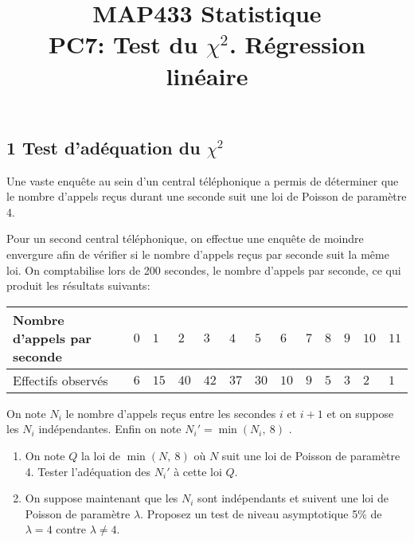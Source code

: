 \documentclass[a4paper,10pt]{article}
\begin{document}
\title{{\bf MAP433 Statistique}\\
{\bf PC7:  Test du $\chi^{2}$. R\'{e}gression lin\'{e}aire}}
\date{}
\maketitle

\subsection*{1 Test d'ad\'{e}quation du $\chi^{2}$}

Une vaste enqu\^{e}te au sein d'un central t\'{e}l\'{e}phonique a permis de d\'{e}terminer que le nombre d'appels re\c{c}us durant une seconde suit une loi de Poisson de param\`{e}tre 4.

Pour un second central t\'{e}l\'{e}phonique, on effectue une enqu\^{e}te de moindre envergure afin de v\'{e}rifier si le nombre d'appels re\c{c}us par seconde suit la m\^{e}me loi. On comptabilise lors de 200 secondes, le nombre d'appels par seconde, ce qui produit les r\'{e}sultats suivants:
\begin{center}
\begin{tabular}{|l|l|l|l|l|l|l|l|l|l|l|l|l|}
\hline
\multicolumn{1}{|l|}{Nombre d'appels par seconde}&	\multicolumn{1}{|l|}{$0$}&	\multicolumn{1}{|l|}{ $1$}&	\multicolumn{1}{|l|}{ $2$}&	\multicolumn{1}{|l|}{ $3$}&	\multicolumn{1}{|l|}{ $4$}&	\multicolumn{1}{|l|}{ $5$}&	\multicolumn{1}{|l|}{ $6$}&	\multicolumn{1}{|l|}{ $7$}&	\multicolumn{1}{|l|}{ $8$}&	\multicolumn{1}{|l|}{ $9$}&	\multicolumn{1}{|l|}{ $10$}&	\multicolumn{1}{|l|}{ $11$}	\\
\hline
\multicolumn{1}{|l|}{Effectifs observ\'{e}s}&	\multicolumn{1}{|l|}{$6$}&	\multicolumn{1}{|l|}{ $15$}&	\multicolumn{1}{|l|}{ $40$}&	\multicolumn{1}{|l|}{ $42$}&	\multicolumn{1}{|l|}{ $37$}&	\multicolumn{1}{|l|}{ $30$}&	\multicolumn{1}{|l|}{ $10$}&	\multicolumn{1}{|l|}{ $9$}&	\multicolumn{1}{|l|}{ $5$}&	\multicolumn{1}{|l|}{ $3$}&	\multicolumn{1}{|l|}{ $2$}&	\multicolumn{1}{|l|}{ $1$}	\\
\hline
\end{tabular}

\end{center}
On note $N_{i}$ le nombre d'appels re\c{c}us entre les secondes $i$ et $i+1$ et on suppose les $N_{i}$ ind\'{e}pendantes. Enfin on note $N_{i}'=\displaystyle \min(N_{i},\ 8)$ .
\begin{enumerate}
\item On note $Q$ la loi de $\displaystyle \min(N,\ 8)$ o\`{u} $N$ suit une loi de Poisson de param\`{e}tre 4. Tester l'ad\'{e}quation des $N_{i}'$ \`{a} cette loi $Q.$
\item On suppose maintenant que les $N_{i}$ sont ind\'{e}pendants et suivent une loi de Poisson de param\`{e}tre $\lambda$. Proposez un test de niveau asymptotique 5\% de $\lambda=4$ contre $\lambda\neq 4.$
\end{enumerate}
\end{document}
